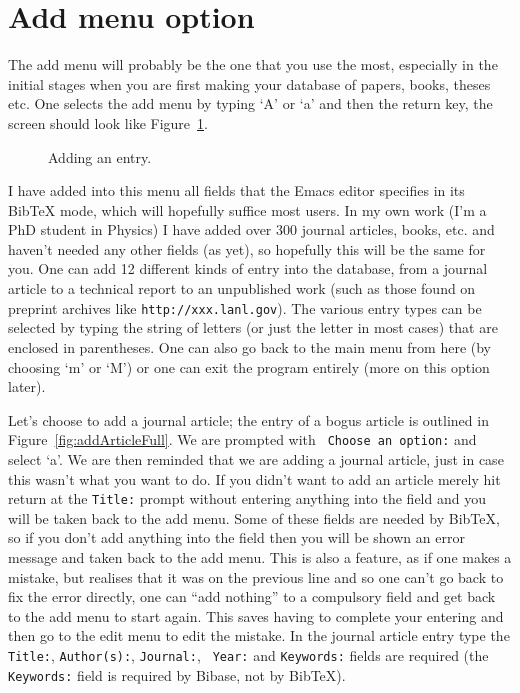 \documentclass[12pt,a4paper]{book}
\newcommand {\fig}[1] {Figure~\ref{#1}}
\begin{document}
\section{Add menu option}

The add menu will probably be the one that you use the most, 
especially in the initial stages when you are first making your 
database of papers, books, theses etc.  One selects the add menu by 
typing `A' or `a' and then the return key, the screen should look 
like \fig{fig:addEntry}.
\begin{figure}[!ht]
\centerline{}
\caption{Adding an entry.}
\label{fig:addEntry}
\end{figure}
I have added into this menu all fields that the Emacs editor 
specifies in its BibTeX mode, which will hopefully suffice most 
users.  In my own work (I'm a PhD student in Physics) I have added 
over 300 journal articles, books, etc. and haven't needed any other 
fields (as yet), so hopefully this will be the same for you.  One can 
add 12 different kinds of entry into the database, from a journal 
article to a technical report to an unpublished work (such as those 
found on preprint archives like {\tt http://xxx.lanl.gov}).  The 
various entry types can be selected by typing the string of letters 
(or just the letter in most cases) that are enclosed in parentheses.  
One can also go back to the main menu from here (by choosing `m' or 
`M') or one can exit the program entirely (more on this option later).

Let's choose to add a journal article; the entry of a bogus article 
is outlined in \fig{fig:addArticleFull}.  We are prompted with {\tt 
Choose an option:} and select `a'.  We are then reminded that we are 
adding a journal article, just in case this wasn't what you want to 
do.  If you didn't want to add an article merely hit return at the 
{\tt Title:} prompt without entering anything into the field and you 
will be taken back to the add menu.  Some of these fields are needed 
by BibTeX, so if you don't add anything into the field then you will 
be shown an error message and taken back to the add menu.  This is 
also a feature, as if one makes a mistake, but realises that it was on 
the previous line and so one can't go back to fix the error directly, 
one can ``add nothing'' to a compulsory field and get back to the add 
menu to start again.  This saves having to complete your entering and 
then go to the edit menu to edit the mistake.  In the journal article 
entry type the {\tt Title:}, {\tt Author(s):}, {\tt Journal:}, {\tt 
Year:} and {\tt Keywords:} fields are required (the {\tt Keywords:} 
field is required by Bibase, not by BibTeX). 
\end{document}
